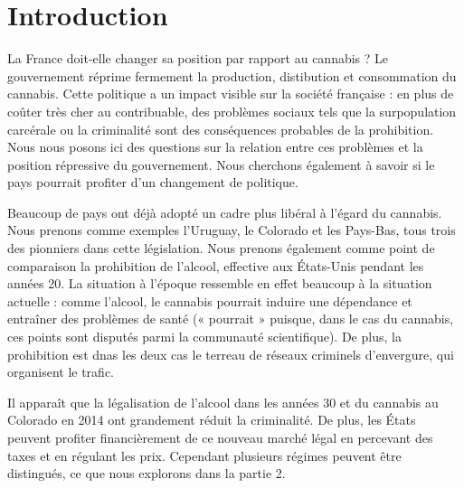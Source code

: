 \chapter*{Introduction}


La France doit-elle changer sa position par rapport au cannabis ? Le gouvernement réprime fermement la production, distibution et consommation du cannabis. Cette politique a un impact visible sur la société française : en plus de coûter très cher au contribuable, des problèmes sociaux tels que la surpopulation carcérale ou la criminalité sont des conséquences probables de la prohibition. Nous nous posons ici des questions sur la relation entre ces problèmes et la position répressive du gouvernement. Nous cherchons également à savoir si le pays pourrait profiter d'un changement de politique.

Beaucoup de pays ont déjà adopté un cadre plus libéral à l'égard du cannabis. Nous prenons comme exemples l'Uruguay, le Colorado et les Pays-Bas, tous trois des pionniers dans cette législation. Nous prenons également comme point de comparaison la prohibition de l'alcool, effective aux États-Unis pendant les années 20. La situation à l'époque ressemble en effet beaucoup à la situation actuelle : comme l'alcool, le cannabis pourrait induire une dépendance et entraîner des problèmes de santé (« pourrait » puisque, dans le cas du cannabis, ces points sont disputés parmi la communauté scientifique). De plus, la prohibition est dnas les deux cas le terreau de réseaux criminels d'envergure, qui organisent le trafic.

Il apparaît que la légalisation de l'alcool dans les années 30 et du cannabis au Colorado en 2014 ont grandement réduit la criminalité. De plus, les États peuvent profiter financièrement de ce nouveau marché légal en percevant des taxes et en régulant les prix. Cependant plusieurs régimes peuvent être distingués, ce que nous explorons dans la partie 2.